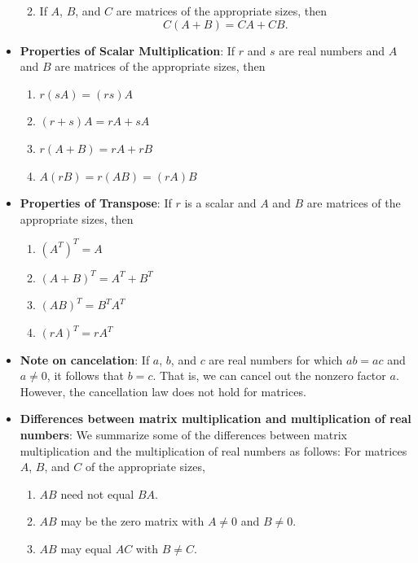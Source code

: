 \documentclass{report}
\begin{document}
\begin{itemize}
\begin{enumerate}
\[                    \]
                \item If \( A \), \( B \), and \( C \) are matrices of the appropriate sizes, then 
                    \[
                        C(A + B) = CA + CB.
                    \]
            \end{enumerate}
        \item \textbf{Properties of Scalar Multiplication}:
            If \( r \) and \( s \) are real numbers and \( A \) and \( B \) are matrices of the appropriate sizes, then
            \begin{enumerate}
                \item \( r(sA) = (rs)A \)
                \item \( (r + s)A = rA + sA \)
                \item \( r(A + B) = rA + rB \)
                \item \( A(rB) = r(AB) = (rA)B \)
            \end{enumerate}
        \item \textbf{Properties of Transpose}:
            If \( r \) is a scalar and \( A \) and \( B \) are matrices of the appropriate sizes, then
            \begin{enumerate}
                \item \( (A^T)^T = A \)
                \item \( (A + B)^T = A^T + B^T \)
                \item \( (AB)^T = B^T A^T \)
                \item \( (rA)^T = rA^T \)
            \end{enumerate}
        \item \textbf{Note on cancelation}: If \( a \), \( b \), and \( c \) are real numbers for which \( ab = ac \) and \( a \neq 0 \), it follows that \( b = c \). That is, we can cancel out the nonzero factor \( a \). However, the cancellation law does not hold for matrices. 
        \item \textbf{Differences between matrix multiplication and multiplication of real numbers}:
            We summarize some of the differences between matrix multiplication and the multiplication of real numbers as follows: For matrices \( A \), \( B \), and \( C \) of the appropriate sizes,
            \begin{enumerate}
                \item \( AB \) need not equal \( BA \).
                \item \( AB \) may be the zero matrix with \( A \neq 0 \) and \( B \neq 0 \).
                \item \( AB \) may equal \( AC \) with \( B \neq C \).
            \end{enumerate}




    \end{itemize}
\end{document}
